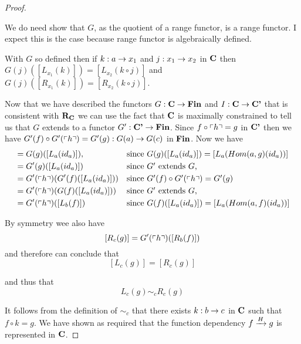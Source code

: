 \begin{proof}
\begin{newtt}
We do need show that $G$, as the quotient of a range functor, is a range functor. I expect this is the case because range functor is algebraically defined.
\end{newtt}

With $G$ so defined then if $k: a \morph x_1$ and $j:x_1 \morph x_2$ in $\catc$
then  $G(j)([L_{x_1}(k)])=[L_{x_2}(k \circ j)]$ and $G(j)([R_{x_1}(k)])=[R_{x_2}(k \circ j)]$. 

Now that we have described the functors  $G: \catc \morph \Fin$ and $I:\catc \morph \catcp$ that is consistent with $\reqtc$
we can use the fact that $\catc$ is maximally constrained to tell us that $G$ extends to a functor 
$G' : \catcp \morph \Fin$. Since $f \circ \qq{h} = g$ in $\catcp$ then we have
 $G'(f) \circ G'(\qq{h}) = G'(g): G(a) \morph G(c)$ in $\Fin$.
Now we have
\begin{align*}
[L_c(g)]&= G(g)([L_a(id_a)]) ,             & & 
                              \mbox{since $G(g)([L_a(id_a)]) = [L_a(Hom(a,g)(id_a))$}] \\
        &= G'(g)([L_a(id_a)])              & & \mbox{since $G'$ extends $G$,}          \\
        &= G'(\qq{h}) (G'(f)([L_a(id_a)])) & & 
                              \mbox{since $G'(f) \circ G'(\qq{h}) = G'(g)$}  \\
        &= G'(\qq{h}) (G(f)([L_a(id_a)])) & & \mbox{since $G'$ extends $G$,}          \\ 
	&= G'(\qq{h}) ([L_b(f)])       & & 
                              \mbox{since $G(f)([L_a(id_a)]) = [L_a(Hom(a,f)(id_a))$}] \\
\end{align*}

By symmetry wee also have
$$[R_c(g)] = G'(\qq{h}) ([R_b(f)])  $$
and therefore can conclude that
$$[L_c(g)] = [R_c(g)]$$

and thus that
$$ L_c(g) \sim_c R_c(g)$$

It follows from the definition of $\sim_c$ that there exists $k:b \morph c$ in 
$\catc$ such that $f \circ k = g$.    
We have shown as required that the function dependency
$\fundep{H}{f}{g}$ is represented in $\catc$.

\end{proof}


